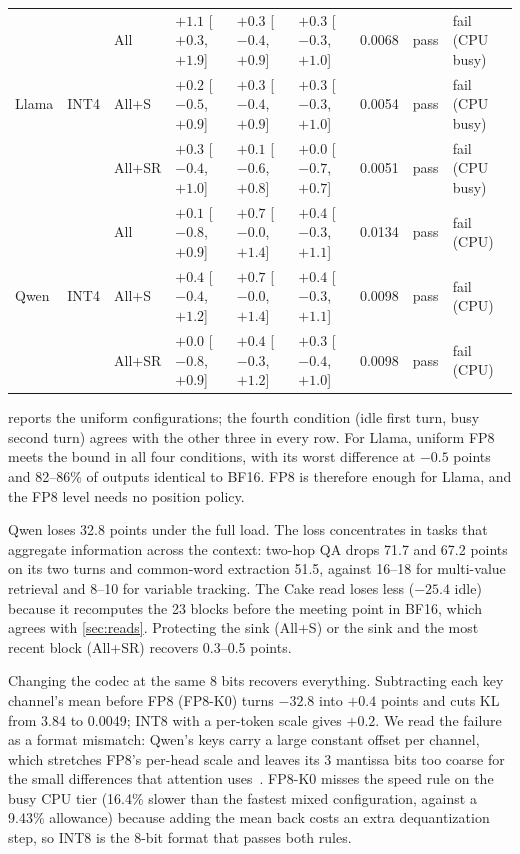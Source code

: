 \documentclass[conference]{IEEEtran}
\newcommand{\cfg}[1]{\textsf{#1}}
\begin{document}
\begin{table}[t]
\begin{tabular}{@{}l l l l l l r l l@{}}
\midrule
\multirow{3}{*}{Llama} & \multirow{3}{*}{INT4} & \cfg{All} & $+1.1$ [$+0.3$, $+1.9$] & $+0.3$ [$-0.4$, $+0.9$] & $+0.3$ [$-0.3$, $+1.0$] & 0.0068 & pass & fail (CPU busy) \\
 & & \cfg{All+S} & $+0.2$ [$-0.5$, $+0.9$] & $+0.3$ [$-0.4$, $+0.9$] & $+0.3$ [$-0.3$, $+1.0$] & 0.0054 & pass & fail (CPU busy) \\
 & & \cfg{All+SR} & $+0.3$ [$-0.4$, $+1.0$] & $+0.1$ [$-0.6$, $+0.8$] & $+0.0$ [$-0.7$, $+0.7$] & 0.0051 & pass & fail (CPU busy) \\
\midrule
\multirow{3}{*}{Qwen} & \multirow{3}{*}{INT4} & \cfg{All} & $+0.1$ [$-0.8$, $+0.9$] & $+0.7$ [$-0.0$, $+1.4$] & $+0.4$ [$-0.3$, $+1.1$] & 0.0134 & pass & fail (CPU) \\
 & & \cfg{All+S} & $+0.4$ [$-0.4$, $+1.2$] & $+0.7$ [$-0.0$, $+1.4$] & $+0.4$ [$-0.3$, $+1.1$] & 0.0098 & pass & fail (CPU) \\
 & & \cfg{All+SR} & $+0.0$ [$-0.8$, $+0.9$] & $+0.4$ [$-0.3$, $+1.2$] & $+0.3$ [$-0.4$, $+1.0$] & 0.0098 & pass & fail (CPU) \\
\bottomrule
\end{tabular}
\end{table}

 reports the uniform configurations; the fourth condition (idle first turn, busy second turn) agrees with the other three in every row.
For Llama, uniform FP8 meets the bound in all four conditions, with its worst difference at $-0.5$ points and 82--86\% of outputs identical to BF16.
FP8 is therefore enough for Llama, and the FP8 level needs no position policy.

Qwen loses 32.8 points under the full load.
The loss concentrates in tasks that aggregate information across the context: two-hop QA drops 71.7 and 67.2 points on its two turns and common-word extraction 51.5, against 16--18 for multi-value retrieval and 8--10 for variable tracking.
The Cake read loses less ($-25.4$ idle) because it recomputes the 23 blocks before the meeting point in BF16, which agrees with \cref{sec:reads}.
Protecting the sink (\cfg{All+S}) or the sink and the most recent block (\cfg{All+SR}) recovers 0.3--0.5 points.

Changing the codec at the same 8 bits recovers everything.
Subtracting each key channel's mean before FP8 (\cfg{FP8-K0}) turns $-32.8$ into $+0.4$ points and cuts KL from 3.84 to 0.0049; INT8 with a per-token scale gives $+0.2$.
We read the failure as a format mismatch: Qwen's keys carry a large constant offset per channel, which stretches FP8's per-head scale and leaves its 3 mantissa bits too coarse for the small differences that attention uses~\cite{fp8formats2022}.
\cfg{FP8-K0} misses the speed rule on the busy CPU tier (16.4\% slower than the fastest mixed configuration, against a 9.43\% allowance) because adding the mean back costs an extra dequantization step, so INT8 is the 8-bit format that passes both rules.
\end{document}

